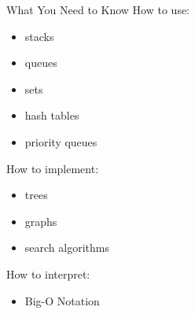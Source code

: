 \documentclass[14pt]{beamer}
\begin{document}
\begin{frame}{What You Need to Know}
How to use:
\begin{itemize}
\item stacks
\item queues
\item sets
\item hash tables
\item priority queues
\end{itemize}
How to implement:
\begin{itemize}
\item trees
\item graphs
\item search algorithms
\end{itemize}
How to interpret:
\begin{itemize}
\item Big-O Notation
\end{itemize}
\end{frame}
\end{document}

